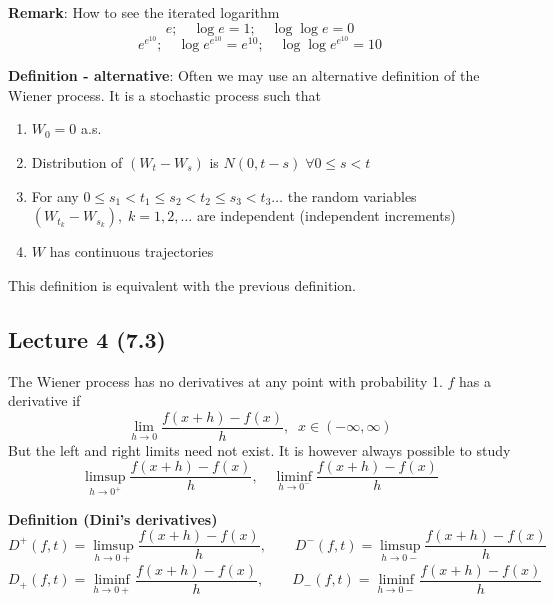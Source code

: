 \documentclass[english]{article}
\newcommand{\note}[1]{\noindent\textbf{#1}}
\begin{document}
\note{Remark}: How to see the iterated logarithm
$$e;\quad \log e = 1; \quad \log \log e = 0$$
$$e^{e^{10}}; \quad \log e^{e^{10}} = e^{10}; \quad \log \log e^{e^{10}} = 10$$

\note{Definition - alternative}: Often we may use an alternative definition of the Wiener process. It is a stochastic process such that \begin{enumerate}
\item $W_0 = 0$ a.s.
\item Distribution of $(W_t - W_s)$ is $N(0,t-s) \; \forall 0\leq s < t$
\item For any $0\leq s_1 < t_1 \leq s_2 < t_2 \leq s_3 < t_3 \dots$ the random variables $(W_{t_k} - W_{s_k}), \; k=1,2,\dots$ are independent (independent increments)
\item $W$ has continuous trajectories
\end{enumerate}
This definition is equivalent with the previous definition.
\subsection*{Lecture 4 (7.3) }
The Wiener process has no derivatives at any point with probability 1. \newline
$f$ has a derivative if
$$\lim_{h\to 0} \frac{f(x+h) - f(x)}{h},\;\; x\in (-\infty, \infty)$$
But the left and right limits need not exist. It is however always possible to study
$$\limsup_{h\to 0^+} \frac{f(x+h) - f(x)}{h},\quad \liminf_{h\to 0^-} \frac{f(x+h) - f(x)}{h}$$

\note{Definition (Dini's derivatives)}
$$D^+(f,t) = \limsup_{h\to 0+}  \frac{f(x+h) - f(x)}{h},\quad\quad D^- (f,t) = \limsup_{h\to 0-}  \frac{f(x+h) - f(x)}{h}$$
$$D_+ (f,t) = \liminf_{h\to 0+}  \frac{f(x+h) - f(x)}{h},\quad\quad D_- (f,t) = \liminf_{h\to 0-}  \frac{f(x+h) - f(x)}{h}$$
\end{document}
